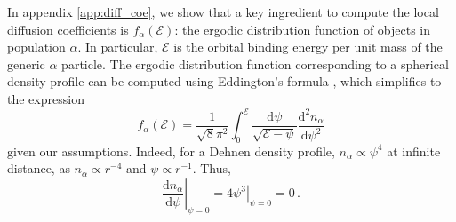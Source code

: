 \documentclass[desactivate]{aa}
\begin{document}
        In appendix \ref{app:diff_coe}, we show that a key ingredient to compute the local diffusion coefficients is $f_\alpha (\mathcal{E})$: the ergodic distribution function of objects in population $\alpha$. In particular, $\mathcal{E}$ is the orbital binding energy per unit mass of the generic $\alpha$ particle. The ergodic distribution function corresponding to a spherical density profile can be computed using Eddington's formula \citep[][see also appendix \ref{app:diff_coe}]{1916MNRAS..76..572E, 2013degn.book.....M}, which simplifies to the expression
        \begin{equation}\label{eq:f_E}
            f_\alpha(\mathcal{E}) = \frac{1}{\sqrt{8}\pi^2} \int^\mathcal{E}_0 \frac{\mathrm{d}\psi}{\sqrt{\mathcal{E}-\psi}}\frac{\mathrm{d}^2 n_\alpha}{\mathrm{d}\psi^2}
        \end{equation}
        given our assumptions. Indeed, for a Dehnen density profile, $n_\alpha \propto \psi^4$ at infinite distance, as $n_\alpha \propto r^{-4}$ and $\psi \propto r^{-1}$. Thus,
        \begin{equation}
            \left.\frac{\mathrm{d}n_\alpha}{\mathrm{d}\psi}\right\rvert_{\psi=0} = \left.4 \psi^3\right\rvert_{\psi=0} = 0 \, .
        \end{equation}
\end{document}

